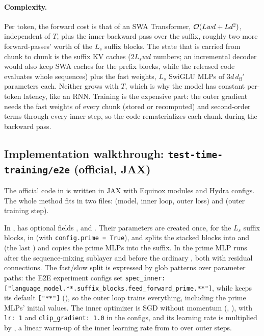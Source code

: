 \paragraph{Complexity.} Per token, the forward cost is that of an SWA Transformer,
$\mathcal{O}(L w d + L d^2)$, independent of $T$, plus the inner backward pass over the suffix,
roughly two more forward-passes' worth of the $L_s$ suffix blocks. The state that is carried
from chunk to chunk is the suffix KV caches ($2 L_s w d$ numbers; an incremental decoder would
also keep SWA caches for the prefix blocks, while the released code evaluates whole sequences)
plus the fast weights, $L_s$ SwiGLU MLPs of
$3 d\, d_{\text{ff}}'$ parameters each. Neither grows with $T$, which is why the model has
constant per-token latency, like an RNN. Training is the expensive part: the outer gradient
needs the fast weights of every chunk (stored or recomputed) and second-order terms through
every inner step, so the code rematerializes each chunk during the backward pass.

\subsection{Implementation walkthrough: \texttt{test-time-training/e2e} (official, JAX)}

The official code in  is written in JAX with Equinox modules and
Hydra configs. The whole method fits in two files:
 (model, inner loop, outer loss) and
 (outer training step).

\begin{implnote}[title={In the code: which parameters are fast}]
In ,  has optional fields
,  and . Their
parameters are created once, for the $L_s$ suffix blocks, in  (with
\texttt{config.prime = True}), and  splits the stacked blocks into
 and  (the last ) and copies the prime
MLPs into the suffix. In  the prime MLP runs after the sequence-mixing
sublayer and before the ordinary , both with residual connections. The
fast/slow split is expressed by glob patterns over parameter paths: the E2E experiment configs
set \texttt{spec\_inner: ["language\_model.**.suffix\_blocks.feed\_forward\_prime.**"]}, while
 keeps its default \texttt{["**"]} (), so the outer loop
trains everything, including the prime MLPs' initial values. The inner optimizer is SGD
without momentum (, ), with
\texttt{lr: 1} and \texttt{clip\_gradient: 1.0} in the configs, and its learning rate is multiplied
by , a linear warm-up of the inner learning rate from
 to  over  outer steps.
\end{implnote}

